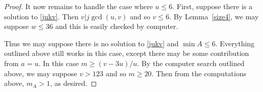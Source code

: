 \documentclass[12pt,reqno]{amsart}
\theoremstyle{dotless}
\newtheorem{lemma}{Lemma}
\begin{document}
\begin{proof}
It now remains to handle the case where $u \leq 6$. First, suppose there is a solution to \eqref{jukv}. Then $v | j\gcd(u,v)$ and so  $v \leq 6$. By Lemma~\ref{size4}, we may suppose $w \leq 36$ and this is easily checked by computer.

Thus we may suppose there is no solution to \eqref{jukv} and $\min A \leq 6$. Everything outlined above still works in this case, except there may be some contribution from $a = u$. In this case $m \geq (v - 3u)/u$. By the computer search outlined above, we may suppose $v > 123$ and so $m \geq 20$. Then from the computations above, $m_A > 1$, as desired. 
\end{proof}




%
%
%
\end{document}
